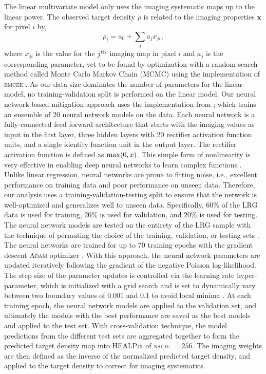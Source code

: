 The linear multivariate model only uses the imaging systematic maps up to the linear power. The observed target density $\rho$ is related to the imaging properties $\textbf{x}$ for pixel $i$ by,
\begin{equation}
    \rho_{i} = a_{0} + \sum_{j} a_{j}x_{ji},
\end{equation}
where $x_{ji}$ is the value for the $j^{\rm th}$ imaging map in pixel $i$ and $a_{j}$ is the corresponding parameter, yet to be found by optimization with a random search method called Monte Carlo Markov Chain (MCMC) using the implementation of \textsc{emcee} \citep{2013PASP..125..306F}. As our data size dominates the number of parameters for the linear model, no training-validation split is performed on the linear model. Our neural network-based mitigation approach uses the implementation from \cite{rezaie2021primordial}; which trains an ensemble of 20 neural network models on the data. Each neural network is a fully-connected feed forward architecture that starts with the imaging values as input in the first layer, three hidden layers with 20 rectifier activation function units, and a single identity function unit in the output layer. The rectifier activation function is defined as ${\rm max}(0, x)$. This simple form of nonlinearity is very effective in enabling deep neural networks to learn complex functions \citep{nair2010rectified}. Unlike linear regression, neural networks are prone to fitting noise, i.e., excellent performance on training data and poor performance on unseen data. Therefore, our analysis uses a training-validation-testing split to ensure that the network is well-optimized and generalizes well to unseen data. Specifically, $60\%$ of the LRG data is used for training, $20\%$ is used for validation, and $20\%$ is used for testing. The neural network models are tested on the entirety of the LRG sample with the technique of permuting the choice of the training, validation, or testing sets \citep{arlot2010survey}. The neural networks are trained for up to 70 training epochs with the gradient descent \textsc{Adam} optimizer \citep{2017arXiv171105101L}. With this approach, the neural network parameters are updated iteratively following the gradient of the negative Poisson log-likelihood. The step size of the parameter updates is controlled via the learning rate hyper-parameter, which is initialized with a grid search and is set to dynamically vary between two boundary values of $0.001$ and $0.1$ to avoid local minima \citep{2016arXiv160803983L}. At each training epoch, the neural network models are applied to the validation set, and ultimately the models with the best performance are saved as the best models and applied to the test set. With cross-validation technique, the model predictions from the different test sets are aggregated together to form the predicted target density map into \textsc{HEALPix} of \textsc{nside} $=256$. The imaging weights are then defined as the inverse of the normalized predicted target density, and applied to the target density to correct for imaging systematics.

